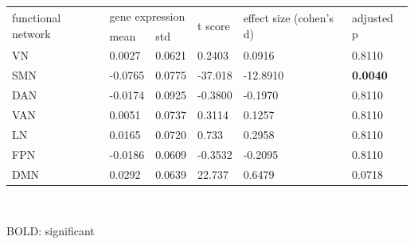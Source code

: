 \begin{refsection}
\begin{table}[H]
\small
\centering
{}\selectfont
{} \label{table3S2} 
\begin{tabular}{@{}llllll@{}}
\toprule
\multirow{2}{*}{functional network} & \multicolumn{2}{l}{gene expression} & \multirow{2}{*}{t score} & \multirow{2}{*}{effect size (cohen's d)} & \multirow{2}{*}{adjusted p} \\ \cmidrule(lr){2-3}
                                    & mean              & std             &                          &                                          &                                   \\ \hline 
VN                                  & 0.0027            & 0.0621          & 0.2403                   & 0.0916                                   & 0.8110                             \\
SMN                                 & -0.0765           & 0.0775          & -37.018                  & -12.8910                                  & \textbf{0.0040}                             \\
DAN                                 & -0.0174           & 0.0925          & -0.3800                    & -0.1970                                   & 0.8110                             \\
VAN                                 & 0.0051            & 0.0737          & 0.3114                   & 0.1257                                   & 0.8110                             \\
LN                                  & 0.0165            & 0.0720           & 0.733                    & 0.2958                                   & 0.8110                             \\
FPN                                 & -0.0186           & 0.0609          & -0.3532                  & -0.2095                                  & 0.8110                             \\
DMN                                 & 0.0292            & 0.0639          & 22.737                   & 0.6479                                   & 0.0718                            \\ \bottomrule
\end{tabular}\\
{\begin{flushleft}
\scriptsize BOLD: significant
\end{flushleft}}
\end{table}



\end{refsection}
